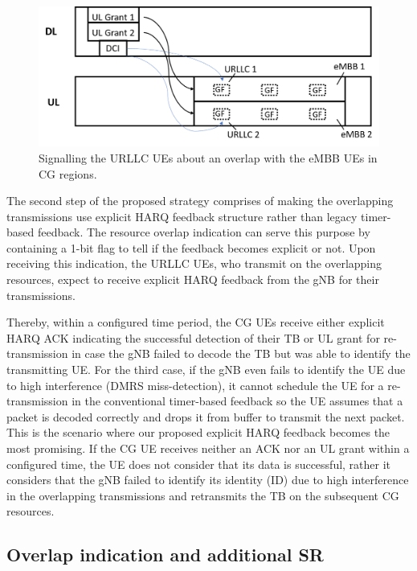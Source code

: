 \documentclass{report}
\begin{document}
\begin{figure}[htbp]
\centerline{\includegraphics[scale=0.35]{fig9.png}}
\caption{Signalling the URLLC UEs about an overlap with the eMBB UEs in CG regions.}
\label{fig9}
\end{figure}

The second step of the proposed strategy comprises of making the overlapping transmissions use explicit HARQ feedback structure rather than legacy timer-based feedback. The resource overlap indication can serve this purpose by containing a 1-bit flag to tell if the feedback becomes explicit or not. Upon receiving this indication, the URLLC UEs, who transmit on the overlapping resources, expect to receive explicit HARQ feedback from the gNB for their transmissions. 

Thereby, within a configured time period, the CG UEs receive either explicit HARQ ACK indicating the successful detection of their TB or UL grant for re-transmission in case the gNB failed to decode the TB but was able to identify the transmitting UE.  For the third case, if the gNB even fails to identify the UE due to high interference (DMRS miss-detection), it cannot schedule the UE for a re-transmission in the conventional timer-based feedback so the UE assumes that a packet is decoded correctly and drops it from buffer to transmit the next packet. This is the scenario where our proposed explicit HARQ feedback becomes the most promising. If the CG UE receives neither an ACK nor an UL grant within a configured time, the UE does not consider that its data is successful, rather it considers that the gNB failed to identify its identity (ID) due to high interference in the overlapping transmissions and retransmits the TB on the subsequent CG resources. 

\subsection{Overlap indication and additional SR}
\end{document}

